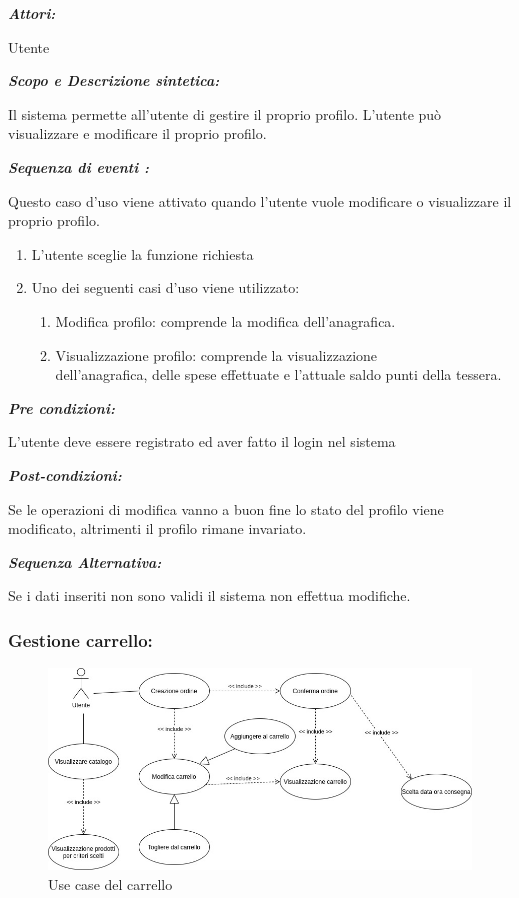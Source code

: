 \documentclass{article}
\begin{document}
\begin{mdframed}
	\noindent\textit{\textbf{Attori:}}


	Utente


	\noindent\textit{\textbf{Scopo e Descrizione sintetica:}}


	Il sistema permette all’utente di gestire il proprio profilo.
	L’utente può visualizzare e modificare il proprio profilo.

	\noindent\textit{\textbf{Sequenza di eventi :}}

	Questo caso d’uso viene attivato quando l’utente vuole modificare o visualizzare il proprio profilo.
	\begin{enumerate}
		\item L’utente sceglie la funzione richiesta
		\item Uno dei seguenti casi d’uso viene utilizzato:
		      \begin{enumerate}
			      \item{ Modifica profilo:
			            comprende la modifica dell'anagrafica.}
			      \item{Visualizzazione profilo: comprende la visualizzazione\\dell'anagrafica,
			            delle spese effettuate e l'attuale saldo punti della tessera.}
		      \end{enumerate}
	\end{enumerate}

	\noindent\textit{\textbf{Pre condizioni:}}


	L’utente deve essere registrato ed aver fatto il login 	nel sistema

	\noindent\textit{\textbf{Post-condizioni:}}


	Se le operazioni di modifica vanno a buon fine lo stato del profilo viene modificato,
	altrimenti il profilo rimane invariato.

	\noindent\textit{\textbf{Sequenza Alternativa:}}


	Se i dati inseriti non sono validi il sistema non effettua modifiche.
\end{mdframed}
\newpage

\subsubsection{Gestione carrello:}

\begin{figure}[h!]
	\centering
	\includegraphics[width=\textwidth]{UseCaseUtenteGestioneCarrello.jpg}
	\caption{Use case del carrello}
	\label{fig:UseCaseUtenteGestioneCarrello}
\end{figure}
\end{document}
